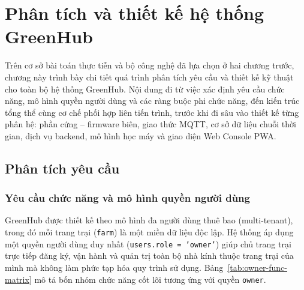 \chapter{Phân tích và thiết kế hệ thống GreenHub}
\label{chap:analysis-design}

Trên cơ sở bài toán thực tiễn và bộ công nghệ đã lựa chọn ở hai chương trước, chương này trình bày chi tiết quá trình phân tích yêu cầu và thiết kế kỹ thuật cho toàn bộ hệ thống GreenHub. Nội dung đi từ việc xác định yêu cầu chức năng, mô hình quyền người dùng và các ràng buộc phi chức năng, đến kiến trúc tổng thể cùng cơ chế phối hợp liên tiến trình, trước khi đi sâu vào thiết kế từng phân hệ: phần cứng -- firmware biên, giao thức MQTT, cơ sở dữ liệu chuỗi thời gian, dịch vụ backend, mô hình học máy và giao diện Web Console PWA.

\section{Phân tích yêu cầu}
\label{sec:c3-requirements}

\subsection{Yêu cầu chức năng và mô hình quyền người dùng}
\label{subsec:c3-func-req}

GreenHub được thiết kế theo mô hình đa người dùng thuê bao (multi-tenant), trong đó mỗi trang trại (\texttt{farm}) là một miền dữ liệu độc lập. Hệ thống áp dụng một quyền người dùng duy nhất (\texttt{users.role = 'owner'}) giúp chủ trang trại trực tiếp đăng ký, vận hành và quản trị toàn bộ nhà kính thuộc trang trại của mình mà không làm phức tạp hóa quy trình sử dụng. Bảng~\ref{tab:owner-func-matrix} mô tả bốn nhóm chức năng cốt lõi tương ứng với quyền \texttt{owner}.


